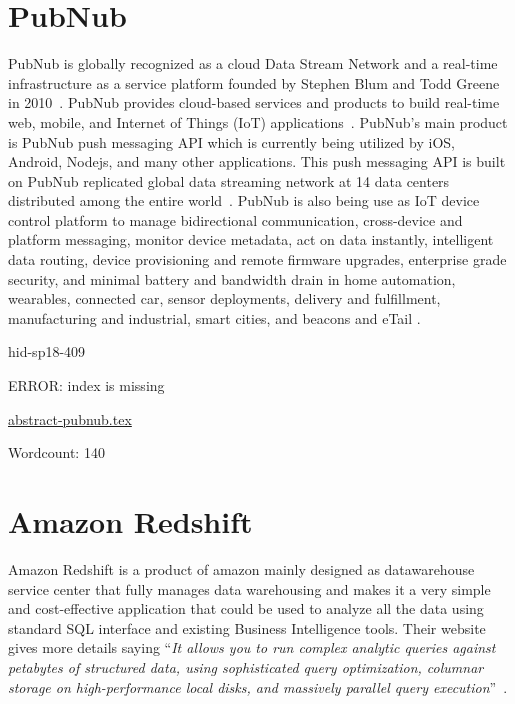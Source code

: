 \section{PubNub}

PubNub is globally recognized as a cloud Data Stream Network and a real-time
infrastructure as a service platform founded by Stephen Blum and Todd Greene in
2010~\cite{ hid-sp18-409-www-pubnub}. PubNub provides cloud-based services and
products to build real-time web, mobile, and Internet of Things (IoT)
applications~\cite{ hid-sp18-409-www-pubnub-wikipedia}. PubNub's main product is
PubNub push messaging API which is currently being utilized by iOS, Android,
Nodejs, and many other applications.  This push messaging API is built on PubNub
replicated global data streaming network at 14 data centers distributed among
the entire world~\cite{hid-sp18-409-www-pubnub-wikipedia}.  PubNub is also being
use as IoT device control platform to manage bidirectional communication,
cross-device and platform messaging, monitor device metadata, act on data
instantly, intelligent data routing, device provisioning and remote firmware
upgrades, enterprise grade security, and minimal battery and bandwidth drain in
home automation, wearables, connected car, sensor deployments, delivery and
fulfillment, manufacturing and industrial, smart cities, and beacons and eTail
\cite{hid-sp18-409-www-pubnub}.


\begin{IU}

hid-sp18-409

ERROR: index is missing

\href{https://github.com/cloudmesh-community/hid-sp18-409/blob/master//technology/abstract-pubnub.tex}{abstract-pubnub.tex}

 

Wordcount: 140

\end{IU}

\section{Amazon Redshift}

Amazon Redshift is a product of amazon mainly designed as
datawarehouse service center that fully manages data warehousing and
makes it a very simple and cost-effective application that could be
used to analyze all the data using standard SQL interface and existing
Business Intelligence tools.  Their website gives more details saying
\color{blue}``\emph{It allows you to run complex analytic queries against petabytes of
structured data, using sophisticated query optimization, columnar
storage on high-performance local disks, and massively parallel query
execution}''\color{black}~\cite{hid-sp18-410-Amazon-Redshift}.

